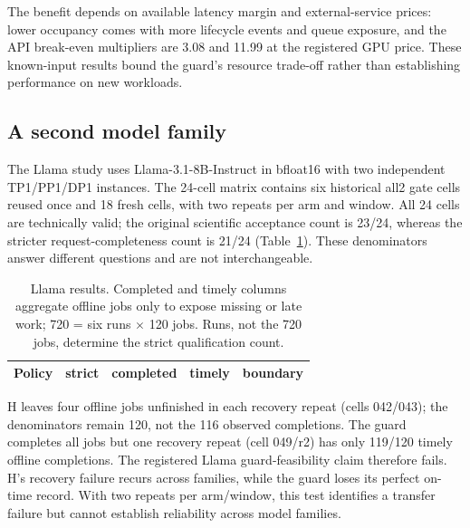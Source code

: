 The benefit depends on available latency margin and external-service prices:
lower occupancy comes with more lifecycle events and queue exposure, and the
API break-even multipliers are 3.08 and 11.99 at the registered GPU price.
These known-input results bound the guard's resource trade-off rather than
establishing performance on new workloads.

\subsection{A second model family}
The Llama study uses Llama-3.1-8B-Instruct in bfloat16 with two independent TP1/PP1/DP1
instances. The 24-cell matrix contains six historical all2 gate cells reused
once and 18 fresh cells, with two repeats per arm and window. All 24 cells are
technically valid; the original scientific acceptance count is 23/24, whereas
the stricter request-completeness count is 21/24 (Table~\ref{tab:w2}). These
denominators answer different questions and are not interchangeable.

\begin{table}[t]
\centering
\small
\caption{Llama results. Completed and timely columns aggregate offline
jobs only to expose missing or late work; 720 = six runs $\times$ 120 jobs.
Runs, not the 720 jobs, determine the strict qualification count.}
\label{tab:w2}
\setlength{\tabcolsep}{2pt}
\par\vspace{4pt}
\begin{tabular*}{\linewidth}{@{\extracolsep{\fill}}lrrrl@{}}
\toprule
Policy & strict & completed & timely & boundary\\
\midrule

\end{tabular*}
\end{table}

H leaves four offline jobs unfinished in each recovery repeat (cells 042/043);
the denominators remain 120, not the 116 observed completions. The guard completes
all jobs but one recovery repeat (cell 049/r2) has only 119/120 timely offline
completions. The registered Llama guard-feasibility claim therefore fails. H's recovery
failure recurs across families, while the guard loses its perfect on-time
record. With two repeats per arm/window, this test identifies a transfer
failure but cannot establish reliability across model families.



